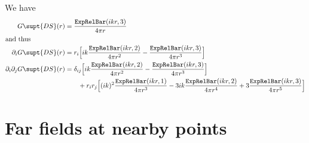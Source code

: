 \documentclass[letterpaper]{article}
\begin{document}
We have
\begin{align*}
 G\supt{DS}(r) &= \frac{\texttt{ExpRelBar}(ikr,3)}{4\pi r}
\\
\intertext{and thus}
\partial_i 
 G\supt{DS}(r) &= 
       r_i  \Big[ ik\frac{\texttt{ExpRelBar}(ikr,2)}{4\pi r^2}
                   -\frac{\texttt{ExpRelBar}(ikr,3)}{4\pi r^3}
            \Big]
\\
\partial_i \partial_j
 G\supt{DS}(r) &= 
  \delta_{ij} \Big[ ik \frac{\texttt{ExpRelBar}(ikr,2)}{4\pi r^2}
                   -\frac{\texttt{ExpRelBar}(ikr,3)}{4\pi r^3}
              \Big]
\\
&\qquad 
 +r_i r_j   \Big[ (ik)^2 \frac{\texttt{ExpRelBar}(ikr,1)}{4\pi r^3}
                  -3ik\frac{\texttt{ExpRelBar}(ikr,2)}{4\pi r^4}
                  +3\frac{\texttt{ExpRelBar}(ikr,3)}{4\pi r^5}
            \Big]
\end{align*}

\newpage
\section{Far fields at nearby points}
\end{document}
